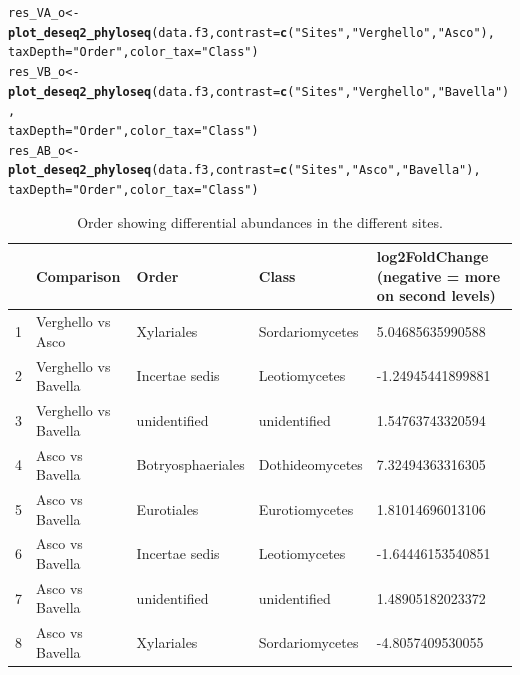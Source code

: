 \documentclass[12pt]{article}\usepackage[]{graphicx}\usepackage[]{color}
\makeatletter
\newcommand{\hlstr}[1]{\textcolor[rgb]{0.192,0.494,0.8}{#1}}%
\newcommand{\hlstd}[1]{\textcolor[rgb]{0.345,0.345,0.345}{#1}}%
\newcommand{\hlkwb}[1]{\textcolor[rgb]{0.69,0.353,0.396}{#1}}%
\newcommand{\hlkwc}[1]{\textcolor[rgb]{0.333,0.667,0.333}{#1}}%
\newcommand{\hlkwd}[1]{\textcolor[rgb]{0.737,0.353,0.396}{\textbf{#1}}}%
\newenvironment{kframe}{%
 \def\at@end@of@kframe{}%
 \ifinner\ifhmode%
  \def\at@end@of@kframe{\end{minipage}}%
  \begin{minipage}{\columnwidth}%
 \fi\fi%
 \def\FrameCommand##1{\hskip\@totalleftmargin \hskip-\fboxsep
 \colorbox{shadecolor}{##1}\hskip-\fboxsep
     \hskip-\linewidth \hskip-\@totalleftmargin \hskip\columnwidth}%
 \MakeFramed {\advance\hsize-\width
   \@totalleftmargin\z@ \linewidth\hsize
   \@setminipage}}%
 {\par\unskip\endMakeFramed%
 \at@end@of@kframe}
\newenvironment{knitrout}{}{} %
\numberwithin{figure}{section}
\makeatother
\begin{document}
\begin{knitrout}\small
{}\color{fgcolor}\begin{kframe}
\begin{alltt}
\hlstd{res_VA_o} \hlkwb{<-} \hlkwd{plot_deseq2_phyloseq}\hlstd{(data.f3,} \hlkwc{contrast} \hlstd{=} \hlkwd{c}\hlstd{(}\hlstr{"Sites"}\hlstd{,} \hlstr{"Verghello"}\hlstd{,} \hlstr{"Asco"}\hlstd{),}
                               \hlkwc{taxDepth} \hlstd{=} \hlstr{"Order"}\hlstd{,} \hlkwc{color_tax} \hlstd{=} \hlstr{"Class"}\hlstd{)}
\hlstd{res_VB_o} \hlkwb{<-} \hlkwd{plot_deseq2_phyloseq}\hlstd{(data.f3,} \hlkwc{contrast} \hlstd{=} \hlkwd{c}\hlstd{(}\hlstr{"Sites"}\hlstd{,} \hlstr{"Verghello"}\hlstd{,} \hlstr{"Bavella"}\hlstd{),}
                               \hlkwc{taxDepth} \hlstd{=} \hlstr{"Order"}\hlstd{,} \hlkwc{color_tax} \hlstd{=} \hlstr{"Class"}\hlstd{)}
\hlstd{res_AB_o} \hlkwb{<-} \hlkwd{plot_deseq2_phyloseq}\hlstd{(data.f3,} \hlkwc{contrast} \hlstd{=} \hlkwd{c}\hlstd{(}\hlstr{"Sites"}\hlstd{,} \hlstr{"Asco"}\hlstd{,} \hlstr{"Bavella"}\hlstd{),}
                               \hlkwc{taxDepth} \hlstd{=} \hlstr{"Order"}\hlstd{,} \hlkwc{color_tax} \hlstd{=} \hlstr{"Class"}\hlstd{)}
\end{alltt}
\end{kframe}
\end{knitrout}

\begin{table}[ht]
\centering
\begingroup\tiny
\begin{tabular}{lllll}
  \hline
 & Comparison & Order & Class & log2FoldChange 
 (negative = more on second levels) \\ 
  \hline
1 & Verghello vs Asco & Xylariales & Sordariomycetes & 5.04685635990588 \\ 
  2 & Verghello vs Bavella & Incertae sedis & Leotiomycetes & -1.24945441899881 \\ 
  3 & Verghello vs Bavella & unidentified & unidentified & 1.54763743320594 \\ 
  4 & Asco vs Bavella & Botryosphaeriales & Dothideomycetes & 7.32494363316305 \\ 
  5 & Asco vs Bavella & Eurotiales & Eurotiomycetes & 1.81014696013106 \\ 
  6 & Asco vs Bavella & Incertae sedis & Leotiomycetes & -1.64446153540851 \\ 
  7 & Asco vs Bavella & unidentified & unidentified & 1.48905182023372 \\ 
  8 & Asco vs Bavella & Xylariales & Sordariomycetes & -4.8057409530055 \\ 
   \hline
\end{tabular}
\endgroup
\caption{Order showing differential abundances in the different sites.} 
\end{table}
\end{document}
